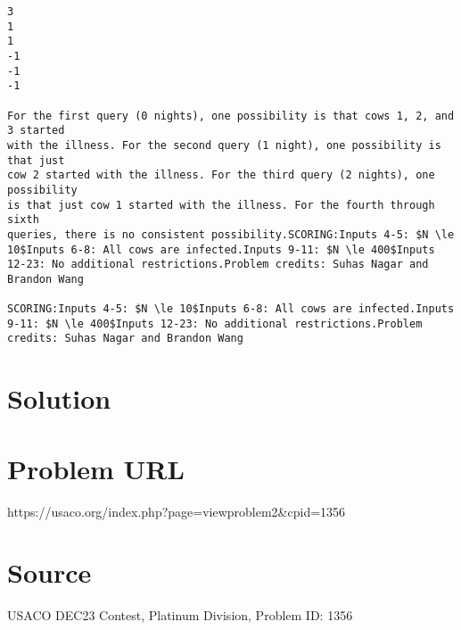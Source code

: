 \documentclass[12pt]{article}
\begin{document}
\begin{verbatim}
3
1
1
-1
-1
-1

For the first query (0 nights), one possibility is that cows 1, 2, and 3 started
with the illness. For the second query (1 night), one possibility is that just
cow 2 started with the illness. For the third query (2 nights), one possibility
is that just cow 1 started with the illness. For the fourth through sixth
queries, there is no consistent possibility.SCORING:Inputs 4-5: $N \le 10$Inputs 6-8: All cows are infected.Inputs 9-11: $N \le 400$Inputs 12-23: No additional restrictions.Problem credits: Suhas Nagar and Brandon Wang

SCORING:Inputs 4-5: $N \le 10$Inputs 6-8: All cows are infected.Inputs 9-11: $N \le 400$Inputs 12-23: No additional restrictions.Problem credits: Suhas Nagar and Brandon Wang
\end{verbatim}

\section*{Solution}


\section*{Problem URL}
https://usaco.org/index.php?page=viewproblem2&cpid=1356

\section*{Source}
USACO DEC23 Contest, Platinum Division, Problem ID: 1356
\end{document}
